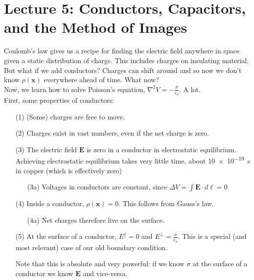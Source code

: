 \documentclass{article}
\numberwithin{equation}{section}
\begin{document}
\newpage

\section*{Lecture 5: Conductors, Capacitors, and the Method of Images}
\setcounter{page}{1}

Coulomb's law gives us a recipe for finding the electric field anywhere in space given a static distribution of charge. This includes charges on insulating material. \\

But what if we add conductors? Charges can shift around and so now we don't know $\rho(\bm{x})$ everywhere ahead of time. What now? \\

Now, we learn how to solve Poisson's equation, $\displaystyle \nabla^2 V = -\frac{\rho}{\epsilon_o}$. A lot. \\

First, some properties of conductors:

\begin{enumerate}

\item[(1)] (Some) charges are free to move.

\item[(2)] Charges exist in vast numbers, even if the net charge is zero.

\item[(3)] The electric field $\bm{E}$ is zero in a conductor in electrostatic equilibrium. Achieving electrostatic equilibrium takes very little time, about \SI{10e-19}{\second} in copper (which is effectively zero)

\begin{enumerate}

\item[(3a)] Voltages in conductors are constant, since $\displaystyle \Delta V = \int \bm{E} \cdot d\bm{\ell} = 0$

\end{enumerate}

\item[(4)] Inside a conductor, $\displaystyle \rho(\bm{x}) = 0$. This follows from Gauss's law.

\begin{enumerate}

\item[(4a)] Net charges therefore live on the surface.

\end{enumerate}

\item[(5)] At the surface of a conductor, $\displaystyle E^{\parallel} = 0$ and $E^{\perp} = \frac{\sigma}{\epsilon_o}$. This is a special (and most relevant) case of our old boundary condition.

Note that this is absolute and very powerful: if we know $\sigma$ at the surface of a conductor we know $\bm{E}$ and vice-versa.

\end{enumerate}
\end{document}
